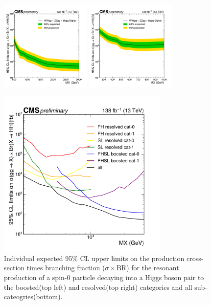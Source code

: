 \begin{figure}[htbp!]
  \centering
  \includegraphics[width=0.4\textwidth]{figures/Limit/Run2_HH_limit_cat12.pdf}%
  \includegraphics[width=0.4\textwidth]{figures/Limit/Run2_HH_limit_cat34.pdf}%

  \includegraphics[width=0.75\textwidth]{figures/Limit/Run2_individual_cats_HH.pdf}%
  \caption{Individual expected 95\% CL upper limits on the production cross-section times branching fraction ($\sigma \times \text{BR}$) for the resonant production of a spin-0 particle decaying into a Higgs boson pair to the boosted(top left) and resolved(top right) categories and all sub-cateogries(bottom).}
  \label{fig:limits_separate}
\end{figure}




